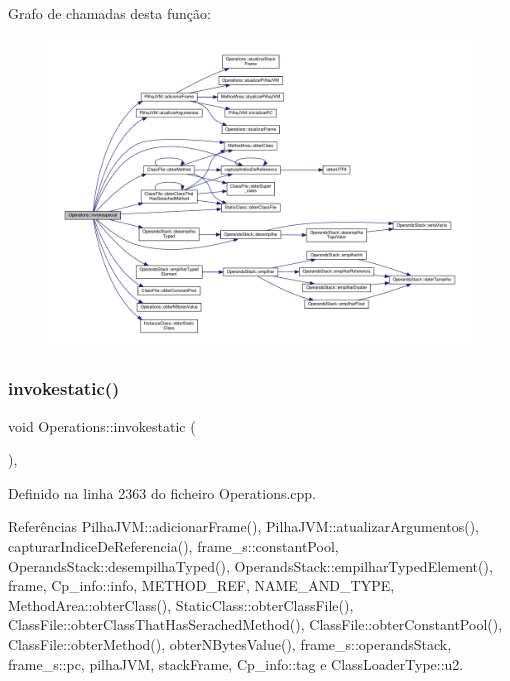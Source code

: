 Grafo de chamadas desta função\+:\nopagebreak
\begin{figure}[H]
\begin{center}
\leavevmode
\includegraphics[width=350pt]{classOperations_ab561e27c8450ceec7e4f8b0a155fcda3_cgraph}
\end{center}
\end{figure}
\mbox{\label{classOperations_a562d8c9cc5975de2ee6d1a95e1969724}} 
\subsubsection{\texorpdfstring{invokestatic()}{invokestatic()}}
{\footnotesize\ttfamily void Operations\+::invokestatic (\begin{DoxyParamCaption}{ }\end{DoxyParamCaption})\hspace{0.3cm}{\ttfamily [static]}, {\ttfamily [private]}}



Definido na linha 2363 do ficheiro Operations.\+cpp.



Referências Pilha\+J\+V\+M\+::adicionar\+Frame(), Pilha\+J\+V\+M\+::atualizar\+Argumentos(), capturar\+Indice\+De\+Referencia(), frame\+\_\+s\+::constant\+Pool, Operands\+Stack\+::desempilha\+Typed(), Operands\+Stack\+::empilhar\+Typed\+Element(), frame, Cp\+\_\+info\+::info, M\+E\+T\+H\+O\+D\+\_\+\+R\+EF, N\+A\+M\+E\+\_\+\+A\+N\+D\+\_\+\+T\+Y\+PE, Method\+Area\+::obter\+Class(), Static\+Class\+::obter\+Class\+File(), Class\+File\+::obter\+Class\+That\+Has\+Serached\+Method(), Class\+File\+::obter\+Constant\+Pool(), Class\+File\+::obter\+Method(), obter\+N\+Bytes\+Value(), frame\+\_\+s\+::operands\+Stack, frame\+\_\+s\+::pc, pilha\+J\+VM, stack\+Frame, Cp\+\_\+info\+::tag e Class\+Loader\+Type\+::u2.

